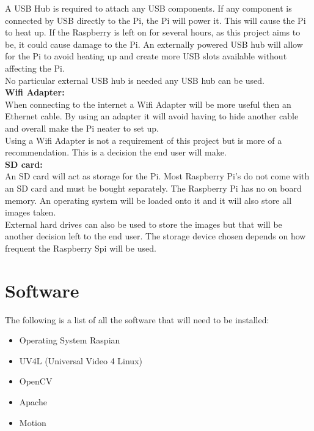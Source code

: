 \documentclass[]{report}
\begin{document}
A USB Hub is required to attach any USB components. If any component is connected by USB directly to the Pi, the Pi will power it. This will cause the Pi to heat up. If the Raspberry is left on for several hours, as this project aims to be, it could cause damage to the Pi. An externally powered USB hub will allow for the Pi to avoid heating up and create more USB slots available without affecting the Pi.\\ 

No particular external USB hub is needed any USB hub can be used.\\


{\bf Wifi Adapter:}\\

When connecting to the internet a Wifi Adapter will be more useful then an Ethernet cable. By using an adapter it will avoid having to hide another cable and overall make the Pi neater to set up.\\

Using a Wifi Adapter is not a requirement of this project but is more of a recommendation. This is a decision the end user will make.\\

{\bf SD card:}\\

An SD card will act as storage for the Pi. Most Raspberry Pi's do not come with an SD card and must be bought separately. The Raspberry Pi has no on board memory. An operating system will be loaded onto it and it will also store all images taken.\\

External hard drives can also be used to store the images but that will be another decision left to the end user. The storage device chosen depends on how frequent the Raspberry Spi will be used.\\


\section {Software}	
\label {sec:software}	
The following is a list of all the software that will need to be installed:
\begin {itemize}
  \item Operating System Raspian 
  \item UV4L (Universal Video 4 Linux)  
  \item OpenCV
  \item Apache
  \item Motion
\end {itemize}
\end{document}
